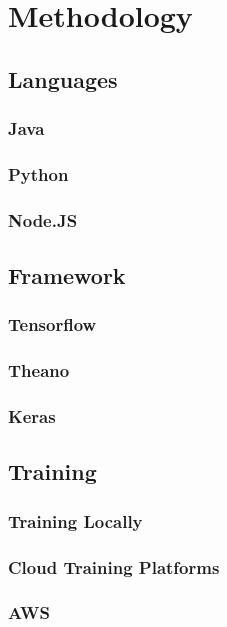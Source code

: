 \chapter{Methodology}

\section{Languages}

\subsection{Java}
\subsection{Python}
\subsection{Node.JS}

\section{Framework}

\subsection{Tensorflow}
\subsection{Theano}
\subsection{Keras}


\section{Training}

\subsection{Training Locally}

\subsection{Cloud Training Platforms}
\subsection{AWS}

